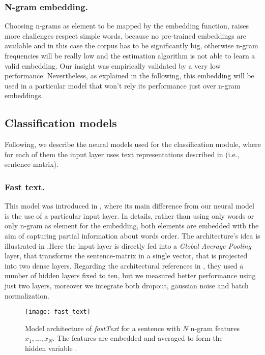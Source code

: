\subsubsection{N-gram embedding.}
Choosing n-grams as element to be mapped by the embedding function, raises more challenges respect simple words, because no pre-trained embeddings are available and in this case the corpus has to be significantly big, otherwise n-gram frequencies will be really low and the estimation algorithm is not able to learn a valid embedding.
Our insight was empirically validated by a very low performance. Nevertheless, as explained in the following, this embedding will be used in a particular model that won't rely its performance just over n-gram embeddings.


\subsection{Classification models} \label{subsec:classificationModel}
Following, we describe the neural models used for the classification module, where for each of them the input layer uses text representations described in  (i.e., sentence-matrix).


\subsubsection{Fast text.}
This model was introduced in \cite{joulin2016bag}, where its main difference from our neural model is the use of a particular input layer. In details, rather than using only words or only n-gram as element for the embedding, both elements are embedded with the aim of capturing partial information about words order.
The architecture's idea  is illustrated in .Here the input layer is directly fed into a \emph{Global Average Pooling} layer, that transforms the sentence-matrix in a single vector, that is projected into two dense layers.
Regarding the architectural references in \cite{joulin2016bag}, they used a number of hidden layers fixed to ten, but we measured better performance using just two layers, moreover we integrate both dropout, gaussian noise and batch normalization.

\begin{figure}[h]
\footnotesize
\centering
\texttt{[image: fast\_text]}
\caption{Model architecture of \emph{fastText} for a sentence with $N$ n-gram features $x_1,\dots,x_N$. The features are embedded and averaged to form the hidden variable \cite{joulin2016bag}.}
\label{fig:fastText}
\end{figure}


